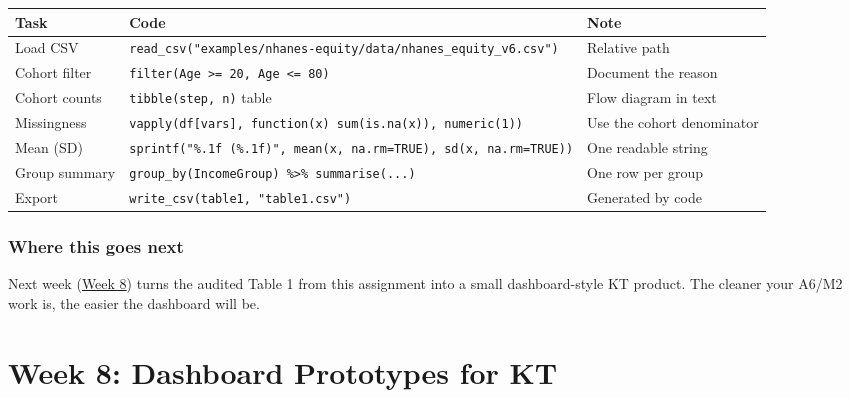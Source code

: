 \documentclass[
  letterpaper,
  DIV=11,
  numbers=noendperiod,
  oneside]{scrreprt}
\begin{document}
\begin{longtable}[]{@{}
  >{\raggedright\arraybackslash}p{}
  >{\raggedright\arraybackslash}p{}
  >{\raggedright\arraybackslash}p{}@{}}
\toprule\noalign{}
\begin{minipage}[b]{\linewidth}\raggedright
Task
\end{minipage} & \begin{minipage}[b]{\linewidth}\raggedright
Code
\end{minipage} & \begin{minipage}[b]{\linewidth}\raggedright
Note
\end{minipage} \\
\midrule\noalign{}
\endhead
\bottomrule\noalign{}
\endlastfoot
Load CSV &
\texttt{read\_csv("examples/nhanes-equity/data/nhanes\_equity\_v6.csv")}
& Relative path \\
Cohort filter &
\texttt{filter(Age\ \textgreater{}=\ 20,\ Age\ \textless{}=\ 80)} &
Document the reason \\
Cohort counts & \texttt{tibble(step,\ n)} table & Flow diagram in
text \\
Missingness &
\texttt{vapply(df{[}vars{]},\ function(x)\ sum(is.na(x)),\ numeric(1))}
& Use the cohort denominator \\
Mean (SD) &
\texttt{sprintf("\%.1f\ (\%.1f)",\ mean(x,\ na.rm=TRUE),\ sd(x,\ na.rm=TRUE))}
& One readable string \\
Group summary &
\texttt{group\_by(IncomeGroup)\ \%\textgreater{}\%\ summarise(...)} &
One row per group \\
Export & \texttt{write\_csv(table1,\ "table1.csv")} & Generated by
code \\
\end{longtable}

\section*{Where this goes next}\label{where-this-goes-next-13}


Next week (\href{../week08-dashboard-kt/index.qmd}{Week 8}) turns the
audited Table 1 from this assignment into a small dashboard-style KT
product. The cleaner your A6/M2 work is, the easier the dashboard will
be.

\part{Week 8: Dashboard Prototypes for KT}
\end{document}
